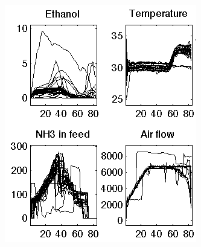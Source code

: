 \begin{frame}
\begin{columns}
			{}
			\vfill
			\includegraphics[height=0.8\textheight]{images/aligned-trajectories-many-batches-yeast.png}
	\end{columns}

\end{frame}

